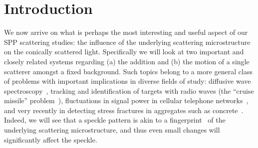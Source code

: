 \section{Introduction}
We now arrive on what is perhaps the most interesting and useful aspect of
our SPP scattering studies: the influence of the underlying scattering
microstructure on the conically scattered light.  Specifically we will look
at two important and closely related systems regarding (a) the addition and
(b) the motion of a single scatterer amongst a fixed background.  Such
topics belong to a more general class of problems with important
implications in diverse fields of study: diffusive wave
spectroscopy~\cite{pine1988diffusing}, tracking and identification of
targets with radio waves (the ``cruise missile''
problem~\cite{atkins1991neural}), fluctuations in signal power in cellular
telephone networks~\cite{abdi2001estimation}, and very recently in
detecting stress fractures in aggregates such as
concrete~\cite{larose2010locating}.  Indeed, we will see that a speckle
pattern is akin to a fingerprint~\cite{ravikanth2001physical} of the
underlying scattering microstructure, and thus even small changes will
significantly affect the speckle.
